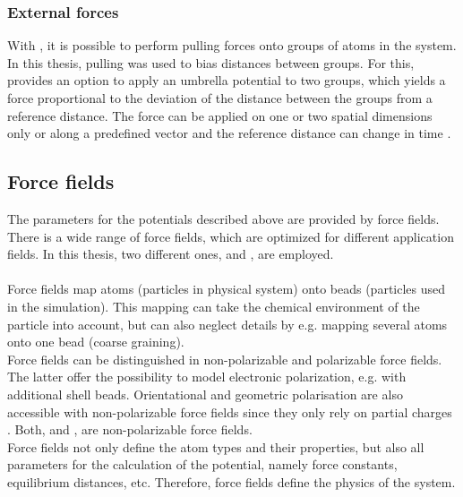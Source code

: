 \subsubsection{External forces}
With \gromacs{}, it is possible to perform pulling forces onto groups of atoms in the system. In this thesis, pulling was used to bias distances between groups. For this, \gromacs{} provides an option to apply an umbrella potential to two groups, which yields a force proportional to the deviation of the distance between the groups from a reference distance. The force can be applied on one or two spatial dimensions only or along a predefined vector and the reference distance can change in time  \autocite[p. 154-159]{gromacsManual}.
\subsection{Force fields}
The parameters for the potentials described above are provided by force fields. There is a wide range of force fields, which are optimized for different application fields. In this thesis, two different ones, \charmm{} and \martini{}, are employed.\\
\\
Force fields map atoms (particles in physical system) onto beads (particles used in the simulation). This mapping can take the chemical environment of the particle into account, but can also neglect details by e.g. mapping several atoms onto one bead (coarse graining).\\
Force fields can be distinguished in non-polarizable and polarizable force fields. The latter offer the possibility to model electronic polarization, e.g. with additional shell beads. Orientational and geometric polarisation are also accessible with non-polarizable force fields since they only rely on partial charges \autocite[p. 215-217]{greenBook}. Both, \martini{} and \charmm{}, are non-polarizable force fields.\\  
Force fields not only define the atom types and their properties, but also all parameters for the calculation of the potential, namely force constants, equilibrium distances, etc. Therefore, force fields define the physics of the system.
